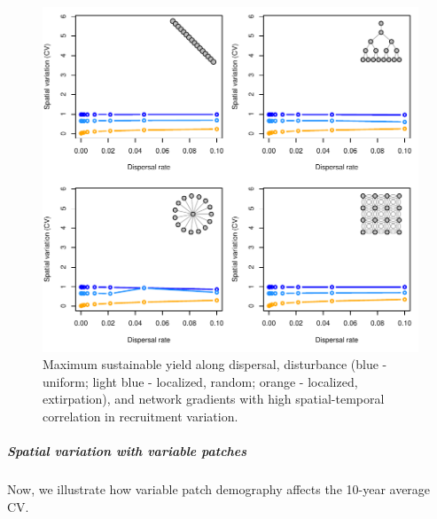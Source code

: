 \documentclass[]{article}
\let\oldsubparagraph\subparagraph
\renewcommand{\subparagraph}[1]{\oldsubparagraph{#1}\mbox{}}
\begin{document}
\begin{figure}[H]

{\centering \includegraphics{Managing_for_ecological_surprises_in_metapopulations_makeHTML_files/figure-latex/CV-1} 

}

\caption{Maximum sustainable yield along dispersal, disturbance (blue - uniform; light blue - localized, random; orange - localized, extirpation), and network gradients with high spatial-temporal correlation in recruitment variation.}\label{fig:CV}
\end{figure}

\hypertarget{spatial-variation-with-variable-patches}{%
\subparagraph{Spatial variation with variable
patches}\label{spatial-variation-with-variable-patches}}

Now, we illustrate how variable patch demography affects the 10-year
average CV.
\end{document}

